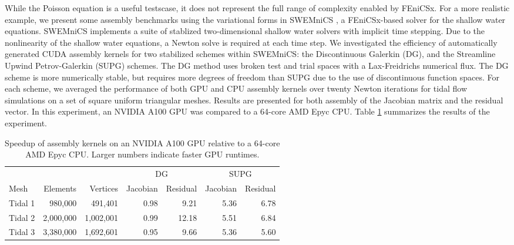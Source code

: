 While the Poisson equation is a useful testscase, it does not represent the full range of complexity enabled by FEniCSx. For a more realistic example, we present some assembly benchmarks using the variational forms in SWEMniCS \citep{dawson2024swemnics}, a FEniCSx-based solver for the shallow water equations. SWEMniCS implements a suite of stablized two-dimensional shallow water solvers with implicit time stepping. Due to the nonlinearity of the shallow water equations, a Newton solve is required at each time step. We investigated the efficiency of automatically generated CUDA assembly kernels for two stabilized schemes within SWEMniCS: the Discontinuous Galerkin (DG), and the Streamline Upwind Petrov-Galerkin (SUPG) schemes. The DG method uses broken test and trial spaces with a Lax-Freidrichs numerical flux. The DG scheme is more numerically stable, but requires more degrees of freedom than SUPG due to the use of discontinuous function spaces. For each scheme, we averaged the performance of both GPU and CPU assembly kernels over twenty Newton iterations for tidal flow simulations on a set of square uniform triangular meshes. Results are presented for both assembly of the Jacobian matrix and the residual vector. In this experiment, an NVIDIA A100 GPU was compared to a 64-core AMD Epyc CPU.
Table \ref{tab:swe_a100_vs_epyc} summarizes the results of the experiment.
\begin{table}[t]
    \centering
    \begin{tabular}{lrrrrrr}
\toprule
        &           &           & \multicolumn{2}{c}{DG} & \multicolumn{2}{c}{SUPG} \\
                                  \cmidrule(lr){4-5}       \cmidrule(lr){6-7}
Mesh    &  Elements &  Vertices & Jacobian & Residual    & Jacobian & Residual \\
\midrule
Tidal 1 &   980,000 &   491,401 &     0.98 &        9.21 &     5.36 &     6.78 \\
Tidal 2 & 2,000,000 & 1,002,001 &     0.99 &       12.18 &     5.51 &     6.84 \\
Tidal 3 & 3,380,000 & 1,692,601 &     0.95 &        9.66 &     5.36 &     5.60 \\
\bottomrule
\end{tabular}
    \caption{Speedup of assembly kernels on an NVIDIA A100 GPU relative to a 64-core AMD Epyc CPU. Larger numbers indicate faster GPU runtimes.}
    \label{tab:swe_a100_vs_epyc}
\end{table}


